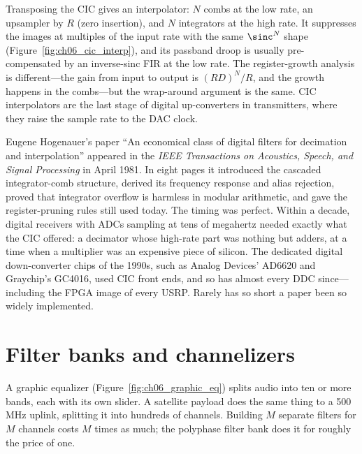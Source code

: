 Transposing the CIC gives an interpolator: $N$ combs at the low rate, an upsampler by $R$ (zero
insertion), and $N$ integrators at the high rate. It suppresses the images at multiples of the input
rate with the same $\sinc^N$ shape (Figure~\ref{fig:ch06_cic_interp}), and its passband droop is usually pre-compensated by an
inverse-sinc FIR at the low rate. The register-growth analysis is different---the gain from input to
output is $(RD)^N/R$, and the growth happens in the combs---but the wrap-around argument is the same.
CIC interpolators are the last stage of digital up-converters in transmitters, where they raise the
sample rate to the DAC clock.


\begin{history}
Eugene Hogenauer's paper ``An economical class of digital filters for decimation and interpolation''
appeared in the \emph{IEEE Transactions on Acoustics, Speech, and Signal Processing} in April 1981.
In eight pages it introduced the cascaded integrator-comb structure, derived its frequency response
and alias rejection, proved that integrator overflow is harmless in modular arithmetic, and gave the
register-pruning rules still used today. The timing was perfect. Within a decade, digital receivers
with ADCs sampling at tens of megahertz needed exactly what the CIC offered: a decimator whose
high-rate part was nothing but adders, at a time when a multiplier was an expensive piece of silicon.
The dedicated digital down-converter chips of the 1990s, such as Analog Devices' AD6620 and
Graychip's GC4016, used CIC front ends, and so has almost every DDC since---including the FPGA image
of every USRP. Rarely has so short a paper been so widely implemented.
\end{history}

\section{Filter banks and channelizers}
\label{sec:ch06:filterbanks}

A graphic equalizer (Figure~\ref{fig:ch06_graphic_eq}) splits audio into ten or more bands, each
with its own slider. A satellite payload does the same thing to a 500\,MHz uplink, splitting it
into hundreds of channels. Building $M$ separate filters for $M$ channels costs $M$ times as much;
the polyphase filter bank does it for roughly the price of one.


